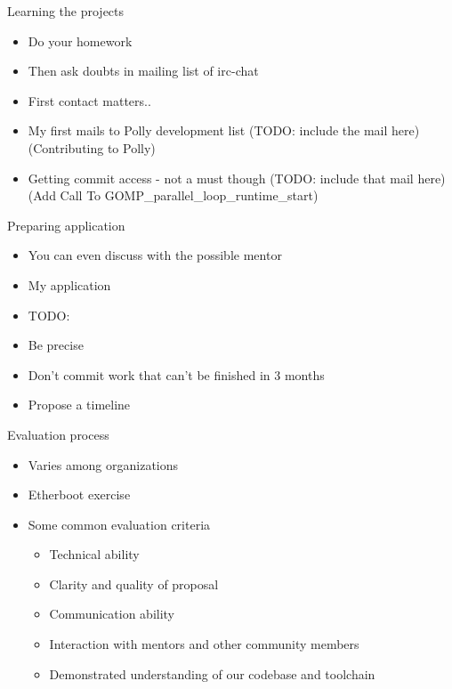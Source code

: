 \documentclass{beamer}
\begin{document}
\begin{frame}{Learning the projects}
\begin{itemize}
\item Do your homework
\item Then ask doubts in mailing list of irc-chat
\item First contact matters..
\item My first mails to Polly development list (TODO: include the mail here)(Contributing to Polly)
\item Getting commit access - not a must though (TODO: include that mail here)(Add Call To GOMP\_parallel\_loop\_runtime\_start)
\end{itemize}
\end{frame}

\begin{frame}{Preparing application}
\begin{itemize}
\item You can even discuss with the possible mentor
\item My application
\item TODO: 
\item Be precise
\item Don't commit work that can't be finished in 3 months
\item Propose a timeline
\end{itemize}
\end{frame}

\begin{frame}{Evaluation process}
\begin{itemize}
\item Varies among organizations
\item Etherboot exercise
\item Some common evaluation criteria
\begin{itemize}
\item Technical ability
\item Clarity and quality of proposal
\item Communication ability
\item Interaction with mentors and other community members
\item Demonstrated understanding of our codebase and toolchain
\end{itemize}
\end{itemize}
\end{frame}

\end{document}
